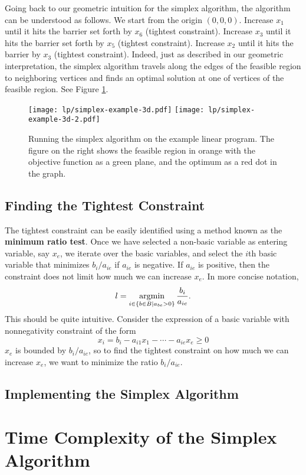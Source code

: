 Going back to our geometric intuition for the simplex algorithm, the algorithm can be understood as follows. We start from the origin $(0,0,0)$. Increase $x_1$ until it hits the barrier set forth by $x_6$ (tightest constraint). Increase $x_3$ until it hits the barrier set forth by $x_5$ (tightest constraint). Increase $x_2$ until it hits the barrier by $x_3$ (tightest constraint). Indeed, just as described in our geometric interpretation, the simplex algorithm travels along the edges of the feasible region to neighboring vertices and finds an optimal solution at one of vertices of the feasible region. See Figure \ref{fig:simplex-example}.

\begin{figure}[htbp]
    \centering
    \texttt{[image: lp/simplex-example-3d.pdf]}
    \qquad\qquad
    \texttt{[image: lp/simplex-example-3d-2.pdf]}
    \caption{Running the simplex algorithm on the example linear program. The figure on the right shows the feasible region in orange with the objective function as a green plane, and the optimum as a red dot in the graph.}
    \label{fig:simplex-example}
\end{figure}

\subsection{Finding the Tightest Constraint}

The tightest constraint can be easily identified using a method known as the \textbf{minimum ratio test}. Once we have selected a non-basic variable as entering variable, say $x_e$, we iterate over the basic variables, and select the $i$th basic variable that minimizes $b_i/a_{ie}$ if $a_{ie}$ is negative. If $a_{ie}$ is positive, then the constraint does not limit how much we can increase $x_e$. In more concise notation, 
$$
l = \operatorname*{\mathrm{argmin}}_{i \in \{b \in B \mid a_{be} > 0\}} \frac{b_i}{a_{ie}}.
$$
This should be quite intuitive. Consider the expression of a basic variable with nonnegativity constraint of the form
$$
x_i = b_i - a_{i1} x_1 - \cdots - a_{ie} x_e \geq 0
$$
$x_e$ is bounded by $b_i/a_{ie}$, so to find the tightest constraint on how much we can increase $x_e$, we want to minimize the ratio $b_i/a_{ie}$.

\subsection{Implementing the Simplex Algorithm}

\section{Time Complexity of the Simplex Algorithm}

